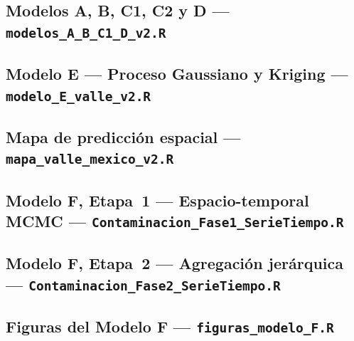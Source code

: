\documentclass[12pt]{article}
\begin{document}
\subsection*{Modelos A, B, C1, C2 y D ---
             \texttt{modelos\_A\_B\_C1\_D\_v2.R}}


\subsection*{Modelo E --- Proceso Gaussiano y Kriging ---
             \texttt{modelo\_E\_valle\_v2.R}}


\subsection*{Mapa de predicci\'on espacial ---
             \texttt{mapa\_valle\_mexico\_v2.R}}


\subsection*{Modelo F, Etapa~1 --- Espacio-temporal MCMC ---
             \texttt{Contaminacion\_Fase1\_SerieTiempo.R}}


\subsection*{Modelo F, Etapa~2 --- Agregaci\'on jer\'arquica ---
             \texttt{Contaminacion\_Fase2\_SerieTiempo.R}}


\subsection*{Figuras del Modelo F ---
             \texttt{figuras\_modelo\_F.R}}

\end{document}
